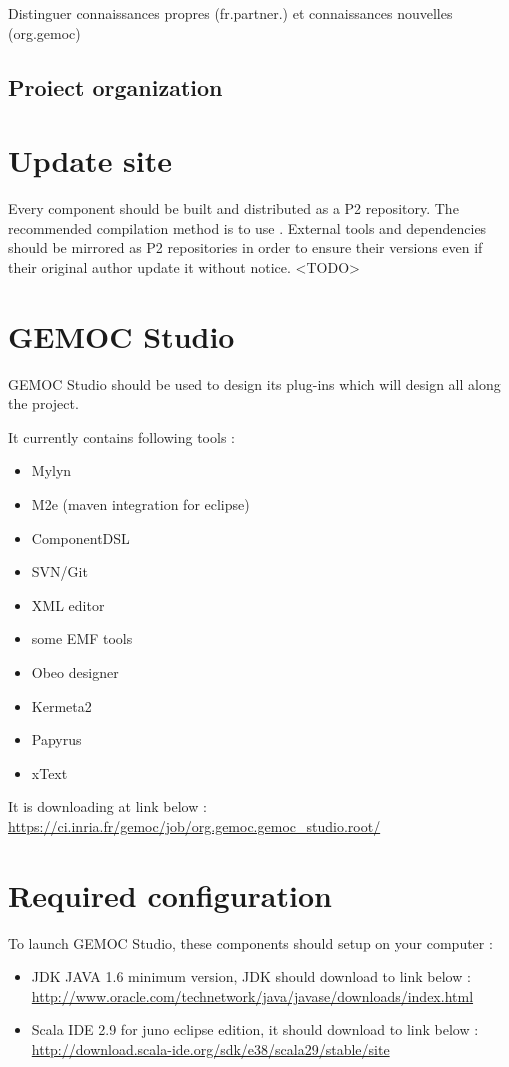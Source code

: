 \documentclass{gemoc} %
\begin{document}
Distinguer connaissances propres (fr.partner.) et connaissances nouvelles (org.gemoc)
\subsection{Proiect organization}
\section{Update site}
Every component should be built and distributed as a P2 repository. The recommended compilation method is to use .
\newline
External tools and dependencies should be mirrored as P2 repositories in order to ensure their versions even if their original author update it without notice.
\newline
\textless TODO\textgreater
\section{GEMOC Studio}
GEMOC Studio should be used to design its plug-ins which will design all along the project.

It currently contains following tools :
\begin{itemize}
	\item Mylyn
	\item M2e (maven integration for eclipse)
	\item ComponentDSL
	\item SVN/Git
	\item XML editor
	\item some EMF tools
	\item Obeo designer
	\item Kermeta2
	\item Papyrus
	\item xText
\end{itemize}
It is downloading at link below :
\newline
\url {https://ci.inria.fr/gemoc/job/org.gemoc.gemoc_studio.root/}
\section{Required configuration}
To launch GEMOC Studio, these components should setup on your computer :
\begin{itemize}
	\item JDK JAVA 1.6 minimum version, JDK should download to link below :
	\newline
	\url {http://www.oracle.com/technetwork/java/javase/downloads/index.html}
	\item Scala IDE 2.9 for juno eclipse edition, it should download to link below :
	\newline
	\url {http://download.scala-ide.org/sdk/e38/scala29/stable/site}
\end{itemize}
\end{document}
